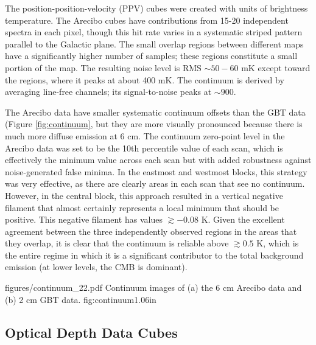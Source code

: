The position-position-velocity (PPV) cubes were created with units of
brightness temperature.  The Arecibo cubes have contributions from 15-20
independent spectra in each pixel, though
this hit rate varies in a systematic striped pattern parallel to the Galactic
plane.  The small overlap regions between different maps have a significantly
higher number of samples; these regions constitute a small portion of the map.
The resulting noise level is RMS $\sim 50-60$ mK except toward the \hii
regions, where it peaks at about 400 mK.  The continuum is derived by averaging
line-free channels; its signal-to-noise peaks at $\sim900$.

The Arecibo data have smaller systematic continuum offsets than the GBT data
(Figure \ref{fig:continuum}, but they are more visually pronounced because
there is much more diffuse emission at 6 cm.  The continuum zero-point level in
the Arecibo data was set to be the 10th percentile value of each scan, which is
effectively the minimum value across each scan but with added robustness
against noise-generated false minima.  In the eastmost and westmost blocks,
this strategy was very effective, as there are clearly areas in each scan that
see no continuum.  However, in the central block, this approach resulted in a
vertical negative filament that almost certainly represents a local minimum
that should be positive.  This negative filament has values $\gtrsim-0.08$ K.
Given the excellent agreement between the three independently observed regions
in the areas that they overlap, it is clear that the continuum is reliable
above $\gtrsim0.5$ K, which is the entire regime in which it is a significant
contributor to the total background emission (at lower levels, the CMB is
dominant).


            {figures/continuum_22.pdf}
{Continuum images of (a) the 6 cm Arecibo data and (b) 2 cm GBT
data.} {fig:continuum}{1.0}{6in}




\subsection{Optical Depth Data Cubes}

